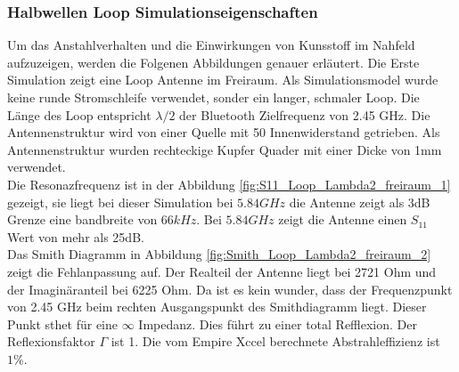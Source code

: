\subsubsection{Halbwellen Loop Simulationseigenschaften}
Um das Anstahlverhalten und die Einwirkungen von Kunsstoff im Nahfeld aufzuzeigen, werden die Folgenen Abbildungen genauer erläutert.
Die Erste Simulation zeigt eine Loop Antenne im Freiraum. Als Simulationsmodel wurde keine runde Stromschleife verwendet, sonder ein langer, schmaler Loop. Die Länge des Loop entspricht $\lambda/2$ der Bluetooth Zielfrequenz von 2.45 GHz. Die Antennenstruktur wird von einer Quelle mit 50 Innenwiderstand getrieben. Als Antennenstruktur wurden  rechteckige Kupfer Quader mit einer Dicke von 1mm verwendet. \\
Die Resonazfrequenz ist in der Abbildung  \ref{fig:S11_Loop_Lambda2_freiraum_1} gezeigt, sie liegt bei dieser Simulation bei $5.84 GHz$ die Antenne zeigt als 3dB Grenze eine bandbreite von $66kHz$. Bei $5.84 GHz$ zeigt die Antenne einen $S_{11}$ Wert von mehr als 25dB.\\
Das Smith Diagramm in  Abbildung \ref{fig:Smith_Loop_Lambda2_freiraum_2} zeigt die Fehlanpassung auf. Der Realteil der Antenne liegt bei 2721 Ohm und der Imaginäranteil bei 6225 Ohm. Da ist es kein wunder, dass der Frequenzpunkt von 2.45 GHz beim rechten Ausgangspunkt des Smithdiagramm liegt. Dieser Punkt sthet für eine $\infty$ Impedanz. Dies führt zu einer total Refflexion. Der Reflexionsfaktor $\Gamma$ ist 1. Die vom Empire Xccel berechnete Abstrahleffizienz ist $1\%$.

